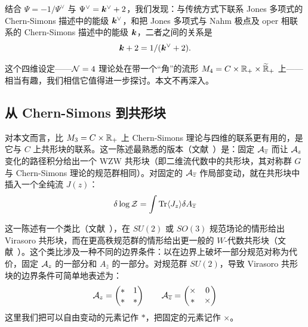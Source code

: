 结合 $\Psi=-1/\Psi^\vee$ 与 $\Psi^\vee
={\boldsymbol{k}}^\vee+2$，我们发现：与传统方式下联系 Jones 多项式的 Chern-Simons 描述中的能级 ${\boldsymbol{k}}^\vee$，和把 Jones 多项式与 Nahm 极点及 oper 相联系的 Chern-Simons 描述中的能级 ${\boldsymbol{k}}$，二者之间的关系是\begin{equation}\label{sdualk} {\boldsymbol{k}}+2=1/({\boldsymbol{k}}^\vee+2).\end{equation}

这个四维设定——${\mathcal N}=4$ 理论处在带一个“角”的流形 $M_4 = C \times {\mathbb R}_+ \times \widetilde {{\mathbb R}}_+$ 上——相当有趣，我们相信它值得进一步探讨。本文不再深入。

\subsection{从 Chern-Simons 到共形块}

对本文而言，比 $M_3=C \times {\mathbb R}_+$ 上 Chern-Simons 理论与四维的联系更有用的，是它与 $C$ 上共形块的联系。这一陈述最熟悉的版本（文献~\cite{WittenJones}）是：固定 ${\mathcal A}_{\overline z}$ 而让 ${\mathcal A}_z$ 变化的路径积分给出一个 WZW 共形块（即二维流代数中的共形块，其对称群 $G$ 与 Chern-Simons 理论的规范群相同）。对固定的 ${\mathcal A}_{\overline z}$ 作局部变动，就在共形块中插入一个全纯流 $J(z)$：
\begin{equation}
\delta \log \mathcal Z = \int \mathrm{Tr} \langle J_z \rangle \delta A_{\overline z}
\end{equation}

这一陈述有一个类比（文献~\cite{HVerlinde}），在 $SU(2)$ 或 $SO(3)$ 规范场论的情形给出 Virasoro 共形块，而在更高秩规范群的情形给出更一般的 $W$-代数共形块（文献~\cite{Bilal,DeBoer}）。这个类比涉及一种不同的边界条件：以在边界上破坏一部分规范对称为代价，固定 ${\mathcal A}_z$ 的一部分和 $A_{\bar z}$ 的一部分。对规范群 $SU(2)$，导致 Virasoro 共形块的边界条件可简单地表述为：
\begin{align}\label{bcon}
{\mathcal A}_z = \begin{pmatrix} * & 1 \cr * & *\end{pmatrix} \qquad {\mathcal A}_{\overline z} = \begin{pmatrix} \times & 0 \cr * & \times\end{pmatrix}
\end{align}
这里我们把可以自由变动的元素记作 $*$，把固定的元素记作 $\times$。

